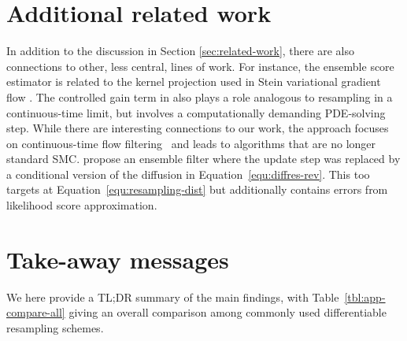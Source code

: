 \documentclass{article}
\begin{document}
\section{Additional related work}
\label{app:additional-related-work}
In addition to the discussion in Section \ref{sec:related-work}, there are also connections to other, less central, lines of work. For instance, the ensemble score estimator is related to the kernel projection used in Stein variational gradient flow \citep{Liu2017stein}. 
The controlled gain term in \citet{Yang2013} also plays a role analogous to resampling in a continuous-time limit, but involves a computationally demanding PDE-solving step. 
While there are interesting connections to our work, the approach focuses on continuous-time flow filtering~\citep[cf.][]{Kang2025} and leads to algorithms that are no longer standard SMC.
\citet{BaoEnsScore2024} propose an ensemble filter where the update step was replaced by a conditional version of the diffusion in Equation~\eqref{equ:diffres-rev}. 
This too targets at Equation~\eqref{equ:resampling-dist} but additionally contains errors from likelihood score approximation. 

\section{Take-away messages}
\label{app:tldr}
We here provide a TL;DR summary of the main findings, with Table~\ref{tbl:app-compare-all} giving an overall comparison among commonly used differentiable resampling schemes. 
\end{document}
